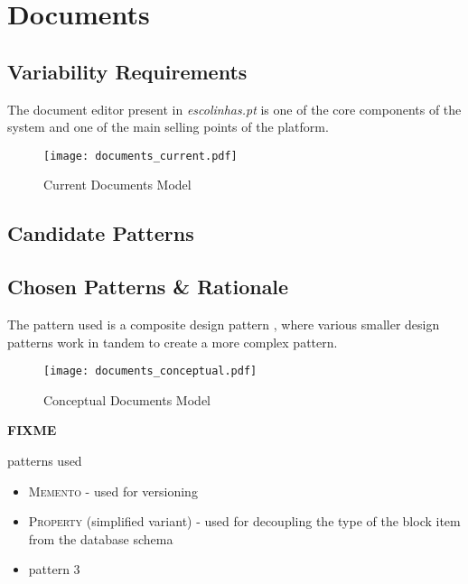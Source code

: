\section{Documents}\label{sec:fa_documents}

\subsection{Variability Requirements}\label{sec:fa_documents_variability_requirements}

The document editor present in \emph{escolinhas.pt} is one of the core components of the system and one of the main selling points of the platform.

\begin{figure}[H]
  \centering
  \texttt{[image: documents\_current.pdf]}
  \caption{Current Documents Model}
  \label{fig:documents_current}
\end{figure}

\subsection{Candidate Patterns}\label{sec:fa_documents_candidate_patterns}

\subsection{Chosen Patterns \& Rationale}\label{sec:fa_documents_chosen_patterns_rationale}

The pattern used is a composite design pattern \cite{riehle_composite_patterns}, where various smaller design patterns work in tandem to create a more complex pattern.

\begin{figure}[H]
  \centering
  \texttt{[image: documents\_conceptual.pdf]}
  \caption{Conceptual Documents Model}
  \label{fig:documents_conceptual}
\end{figure}

\textbf{FIXME}

patterns used
\begin{itemize}
  \item \textsc{Memento} - used for versioning
  \item \textsc{Property} (simplified variant) - used for decoupling the type of the block item from the database schema
  \item pattern 3
\end{itemize}

